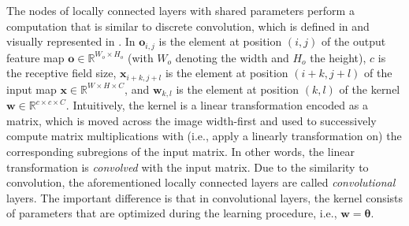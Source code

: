 The nodes of locally connected layers with shared parameters perform a computation that is similar to discrete convolution, which is defined in  and visually represented in . In  $\textbf{o}_{i,j}$ is the element at position $(i,j)$ of the output feature map $\mathbf{o}\in\mathbb{R}^{W_o\times H_o}$ (with $W_o$ denoting the width and $H_o$ the height), $c$ is the receptive field size, $\textbf{x}_{i+k,j+l}$ is the element at position $(i+k,j+l)$ of the input map $\mathbf{x}\in\mathbb{R}^{W\times H\times C}$, and $\textbf{w}_{k,l}$ is the element at position $(k,l)$ of the kernel $\mathbf{w}\in\mathbb{R}^{c\times c\times C}$. Intuitively, the kernel is a linear transformation encoded as a matrix, which is moved across the image width-first and used to successively compute matrix multiplications with (i.e., apply a linearly transformation on) the corresponding subregions of the input matrix. In other words, the linear transformation is \emph{convolved} with the input matrix. Due to the similarity to convolution, the aforementioned locally connected layers are called \emph{convolutional} layers. The important difference is that in convolutional layers, the kernel consists of parameters that are optimized during the learning procedure, i.e., $\mathbf{w}=\boldsymbol{\theta}$.

